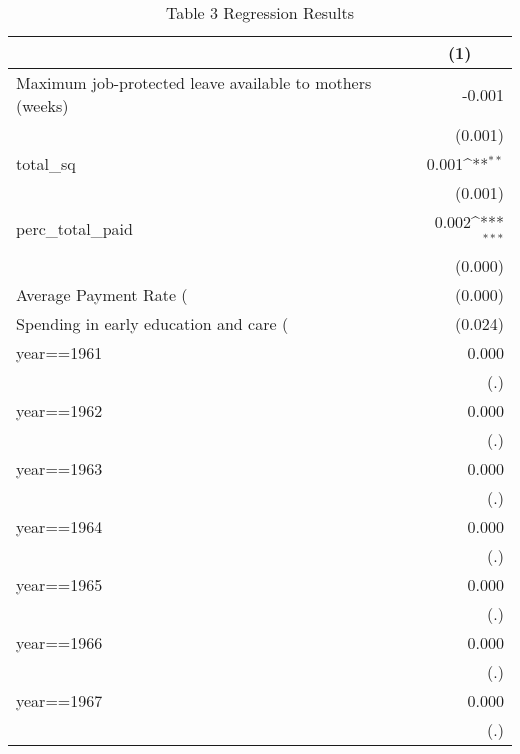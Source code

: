 \begin{table}[htbp]\centering
\def\sym#1{\ifmmode^{#1}\else\(^{#1}\)\fi}
\caption{Table 3 Regression Results \label{reg1}}
\begin{tabular}{l*{1}{D{.}{.}{-1}}}
\toprule
                    &         \\
\midrule
Maximum job-protected leave available to mothers (weeks)&      -0.001         \\
                    &     (0.001)         \\
\addlinespace
total\_sq            &       0.001\sym{**} \\
                    &     (0.001)         \\
\addlinespace
perc\_total\_paid     &       0.002\sym{***}\\
                    &     (0.000)         \\
\addlinespace
Average Payment Rate (%
                    &     (0.000)         \\
\addlinespace
Spending in early education and care (%
                    &     (0.024)         \\
\addlinespace
year==1961          &       0.000         \\
                    &         (.)         \\
\addlinespace
year==1962          &       0.000         \\
                    &         (.)         \\
\addlinespace
year==1963          &       0.000         \\
                    &         (.)         \\
\addlinespace
year==1964          &       0.000         \\
                    &         (.)         \\
\addlinespace
year==1965          &       0.000         \\
                    &         (.)         \\
\addlinespace
year==1966          &       0.000         \\
                    &         (.)         \\
\addlinespace
year==1967          &       0.000         \\
                    &         (.)         \\

\end{tabular}
\end{table}
